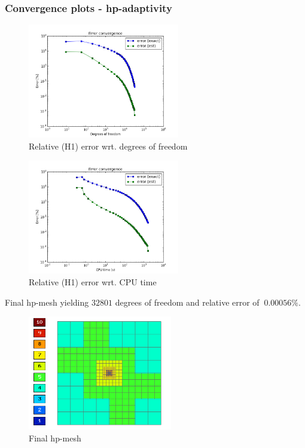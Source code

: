 		\subsubsection{Convergence plots - hp-adaptivity}
			\begin{figure}[H]
				\centering
				\includegraphics[height=5cm]{img/kellog-hp-dof.png}
				\caption{Relative (H1) error wrt. degrees of freedom}
			\end{figure}
			
			\begin{figure}[H]
				\centering
				\includegraphics[height=5cm]{img/kellog-hp-cpu.png}
				\caption{Relative (H1) error wrt. CPU time}
			\end{figure}
			
			Final hp-mesh yielding $32801$ degrees of freedom and relative error of $~0.00056\%$.
			\begin{figure}[H]
				\centering
				\includegraphics[height=5cm]{img/kellog-hp-finalmesh.png}
				\caption{Final hp-mesh}
			\end{figure}

